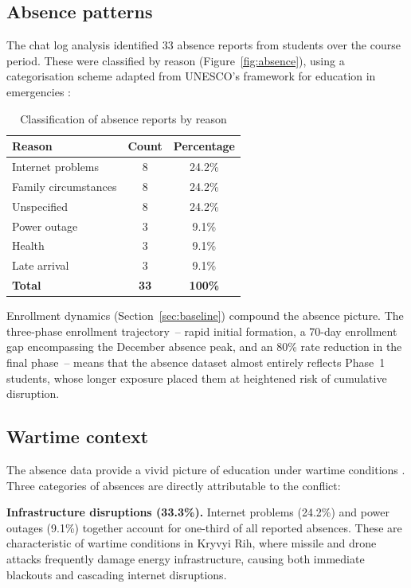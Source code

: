 \subsection{Absence patterns}

The chat log analysis identified 33 absence reports from students over the course period. These were classified by reason (Figure~\ref{fig:absence}), using a categorisation scheme adapted from UNESCO's framework for education in emergencies \cite{UNESCO2023}:

\begin{table}[!h]
\centering
\caption{Classification of absence reports by reason}
\label{tab:absence-reasons}
\begin{tabular}{lcc}
\hline
\textbf{Reason} & \textbf{Count} & \textbf{Percentage} \\
\hline
Internet problems & 8 & 24.2\% \\
Family circumstances & 8 & 24.2\% \\
Unspecified & 8 & 24.2\% \\
Power outage & 3 & 9.1\% \\
Health & 3 & 9.1\% \\
Late arrival & 3 & 9.1\% \\
\hline
\textbf{Total} & \textbf{33} & \textbf{100\%} \\
\hline
\end{tabular}
\end{table}

Enrollment dynamics (Section~\ref{sec:baseline}) compound the absence picture. The three-phase enrollment trajectory~-- rapid initial formation, a 70-day enrollment gap encompassing the December absence peak, and an 80\% rate reduction in the final phase~-- means that the absence dataset almost entirely reflects Phase~1 students, whose longer exposure placed them at heightened risk of cumulative disruption.

\subsection{Wartime context}

The absence data provide a vivid picture of education under wartime conditions \cite{UNESCO2023, Humeniuk2022113}. Three categories of absences are directly attributable to the conflict:

\textbf{Infrastructure disruptions (33.3\%).} Internet problems (24.2\%) and power outages (9.1\%) together account for one-third of all reported absences. These are characteristic of wartime conditions in Kryvyi Rih, where missile and drone attacks frequently damage energy infrastructure, causing both immediate blackouts and cascading internet disruptions.

